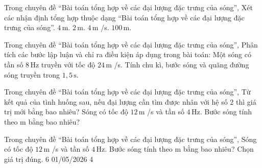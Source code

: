 \begin{ex}
Trong chuyên đề “Bài toán tổng hợp về các đại lượng đặc trưng của sóng”, Xét các nhận định tổng hợp thuộc dạng “Bài toán tổng hợp về các đại lượng đặc trưng của sóng”.
\choiceTF
{\True $4\,\text{m}$.}
{\True $2\,\text{m}$.}
{\True $4\,\text{m}$ /s.}
{$100\,\text{m}$.}
\end{ex}

\begin{ex}
Trong chuyên đề “Bài toán tổng hợp về các đại lượng đặc trưng của sóng”, Phân tích các bước lập luận và chỉ ra điều kiện áp dụng trong bài toán: Một sóng có tần số $8\,\text{Hz}$ truyền với tốc độ $24\,\text{m}$ /s. Tính chu kì, bước sóng và quãng đường sóng truyền trong $1,5\,\text{s}$.
\choiceTF

\end{ex}

\begin{ex}
Trong chuyên đề “Bài toán tổng hợp về các đại lượng đặc trưng của sóng”, Từ kết quả của tình huống sau, nếu đại lượng cần tìm được nhân với hệ số 2 thì giá trị mới bằng bao nhiêu? Sóng có tốc độ $12\,\text{m}$ /s và tần số $4\,\text{Hz}$. Bước sóng tính theo m bằng bao nhiêu?
\end{ex}

\begin{ex}
Trong chuyên đề “Bài toán tổng hợp về các đại lượng đặc trưng của sóng”, Sóng có tốc độ $12\,\text{m}$ /s và tần số $4\,\text{Hz}$. Bước sóng tính theo m bằng bao nhiêu? Chọn giá trị đúng.
\choice
{6}
{01/05/2026}
{4}
{}
\end{ex}

